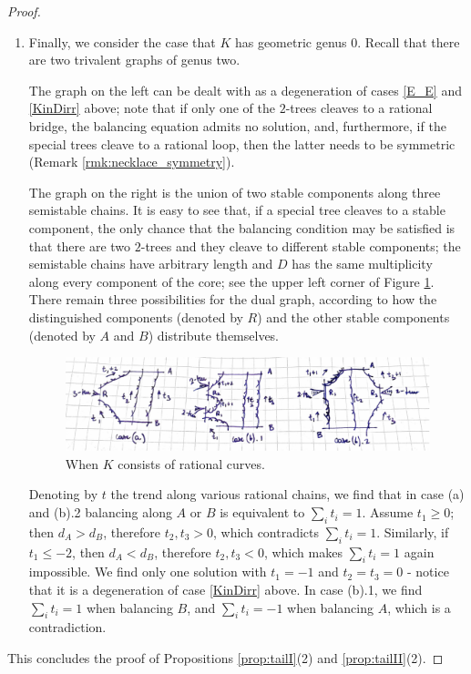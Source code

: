 \documentclass[11pt]{amsart}
\theoremstyle{plain}
\theoremstyle{definition}
\begin{document}
\begin{proof}
\begin{enumerate}[leftmargin=.6cm]
 \item Finally, we consider the case that $K$ has geometric genus $0$. Recall that there are two trivalent graphs of genus two.
 \begin{center}
 \end{center}
The graph on the left can be dealt with as a degeneration of cases \eqref{E_E} and \eqref{KinDirr} above; note that if only one of the $2$-trees cleaves to a rational bridge, the balancing equation admits no solution, and, furthermore, if the special trees cleave to a rational loop, then the latter needs to be symmetric (Remark \ref{rmk:necklace_symmetry}).

The graph on the right is the union of two stable components along three semistable chains. It is easy to see that, if a special tree cleaves to a stable component, the only chance that the balancing condition may be satisfied is that there are two $2$-trees and they cleave to different stable components; the semistable chains have arbitrary length and $D$ has the same multiplicity along every component of the core; see the upper left corner of Figure \ref{fig:Krat}. There remain three possibilities for the dual graph, according to how the distinguished components (denoted by $R$) and the other stable components (denoted by $A$ and $B$) distribute themselves.
  \begin{figure}
 \includegraphics[width=.8\textwidth]{rational_pretzel} 
 \caption{When $K$ consists of rational curves.}\label{fig:Krat}
  \end{figure}
 Denoting by $t$ the trend along various rational chains, we find that in case (a) and (b).2 balancing along $A$ or $B$ is equivalent to $\sum_it_i=1$. Assume $t_1\geq0$; then $d_A>d_B$, therefore $t_2,t_3>0$, which contradicts $\sum_it_i=1$. Similarly, if $t_1\leq -2$, then $d_A<d_B$, therefore $t_2,t_3<0$, which makes $\sum_it_i=1$ again impossible. We find only one solution with $t_1=-1$ and $t_2=t_3=0$ - notice that it is a degeneration of case \ref{KinDirr} above.
 In case (b).1, we find $\sum_it_i=1$ when balancing $B$, and $\sum_it_i=-1$ when balancing $A$, which is a contradiction.
\end{enumerate}
This concludes the proof of Propositions \ref{prop:tailI}(2) and \ref{prop:tailII}(2).
\end{proof}
\end{document}
